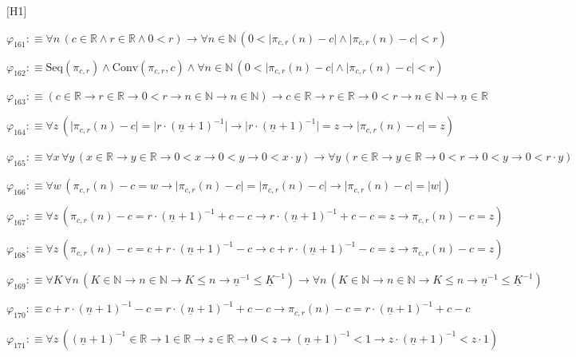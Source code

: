 \begin{fullproof}{[H1]}
\begin{abbrevlist}
\item $\varphi_{161} :\equiv \forall n\,(c \in \mathbb{R} \land r \in \mathbb{R} \land 0 < r) \to \forall n \in \mathbb{N}\,(0 < \lvert \pi_{c,r}(n) - c \rvert \land \lvert \pi_{c,r}(n) - c \rvert < r)$
\item $\varphi_{162} :\equiv \mathrm{Seq}(\pi_{c,r}) \land \mathrm{Conv}(\pi_{c,r},c) \land \forall n \in \mathbb{N}\,(0 < \lvert \pi_{c,r}(n) - c \rvert \land \lvert \pi_{c,r}(n) - c \rvert < r)$
\item $\varphi_{163} :\equiv (c \in \mathbb{R} \to r \in \mathbb{R} \to 0 < r \to n \in \mathbb{N} \to n \in \mathbb{N}) \to c \in \mathbb{R} \to r \in \mathbb{R} \to 0 < r \to n \in \mathbb{N} \to \underline{n} \in \mathbb{R}$
\item $\varphi_{164} :\equiv \forall z\,(\lvert \pi_{c,r}(n) - c \rvert = \lvert r \cdot (\underline{n} + 1)^{-1} \rvert \to \lvert r \cdot (\underline{n} + 1)^{-1} \rvert = z \to \lvert \pi_{c,r}(n) - c \rvert = z)$
\item $\varphi_{165} :\equiv \forall x\,\forall y\,(x \in \mathbb{R} \to y \in \mathbb{R} \to 0 < x \to 0 < y \to 0 < x \cdot y) \to \forall y\,(r \in \mathbb{R} \to y \in \mathbb{R} \to 0 < r \to 0 < y \to 0 < r \cdot y)$
\item $\varphi_{166} :\equiv \forall w\,(\pi_{c,r}(n) - c = w \to \lvert \pi_{c,r}(n) - c \rvert = \lvert \pi_{c,r}(n) - c \rvert \to \lvert \pi_{c,r}(n) - c \rvert = \lvert w \rvert)$
\item $\varphi_{167} :\equiv \forall z\,(\pi_{c,r}(n) - c = r \cdot (\underline{n} + 1)^{-1} + c - c \to r \cdot (\underline{n} + 1)^{-1} + c - c = z \to \pi_{c,r}(n) - c = z)$
\item $\varphi_{168} :\equiv \forall z\,(\pi_{c,r}(n) - c = c + r \cdot (\underline{n} + 1)^{-1} - c \to c + r \cdot (\underline{n} + 1)^{-1} - c = z \to \pi_{c,r}(n) - c = z)$
\item $\varphi_{169} :\equiv \forall K\,\forall n\,(K \in \mathbb{N} \to n \in \mathbb{N} \to K \leq n \to \underline{n}^{-1} \leq \underline{K}^{-1}) \to \forall n\,(K \in \mathbb{N} \to n \in \mathbb{N} \to K \leq n \to \underline{n}^{-1} \leq \underline{K}^{-1})$
\item $\varphi_{170} :\equiv c + r \cdot (\underline{n} + 1)^{-1} - c = r \cdot (\underline{n} + 1)^{-1} + c - c \to \pi_{c,r}(n) - c = r \cdot (\underline{n} + 1)^{-1} + c - c$
\item $\varphi_{171} :\equiv \forall z\,((\underline{n} + 1)^{-1} \in \mathbb{R} \to 1 \in \mathbb{R} \to z \in \mathbb{R} \to 0 < z \to (\underline{n} + 1)^{-1} < 1 \to z \cdot (\underline{n} + 1)^{-1} < z \cdot 1)$

\end{abbrevlist}
\end{fullproof}
